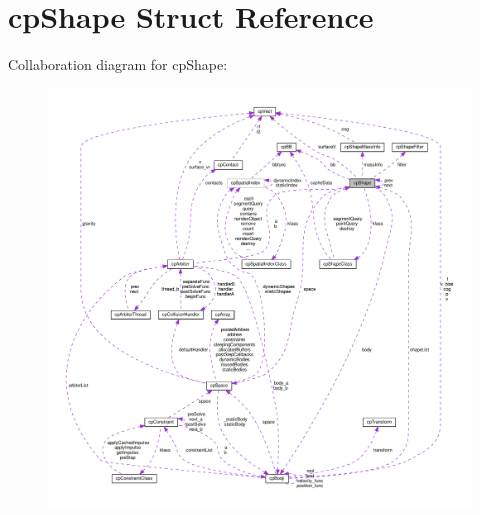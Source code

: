 \hypertarget{structcpShape}{}\section{cp\+Shape Struct Reference}
\label{structcpShape}


Collaboration diagram for cp\+Shape\+:
\nopagebreak
\begin{figure}[H]
\begin{center}
\leavevmode
\includegraphics[width=350pt]{structcpShape__coll__graph}
\end{center}
\end{figure}
